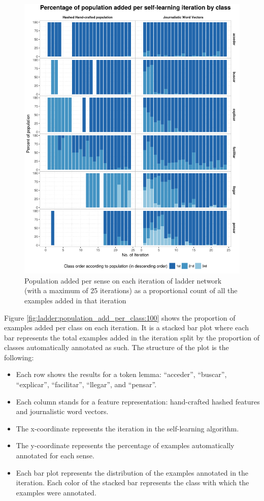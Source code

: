 \begin{figure}[htb!]
  \centering
  \includegraphics[height=0.9\textheight,width=\textwidth,keepaspectratio]
    {plots/ladder/population_add_per_class_25}
  \caption{Population added per sense on each iteration of ladder network (with
  a maximum of 25 iterations) as a proportional count of all the examples
  added in that iteration}
  \label{fig:ladder:population_add_per_class:25}
\end{figure}

Figure \ref{fig:ladder:population_add_per_class:100} shows the proportion of
examples added per class on each iteration. It is a stacked bar plot where each
bar represents the total examples added in the iteration split by the
proportion of classes automatically annotated as such. The structure of the
plot is the following:

\begin{itemize}
  \item Each row shows the results for a token lemma: ``acceder'', ``buscar'',
    ``explicar'', ``facilitar'', ``llegar'', and ``pensar''.
  \item Each column stands for a feature representation: hand-crafted hashed
    features and journalistic word vectors.
  \item The x-coordinate represents the iteration in the self-learning
    algorithm.
  \item The y-coordinate represents the percentage of examples automatically
    annotated for each sense.
  \item Each bar plot represents the distribution of the examples annotated in
    the iteration. Each color of the stacked bar represents the class with
    which the examples were annotated.
\end{itemize}

